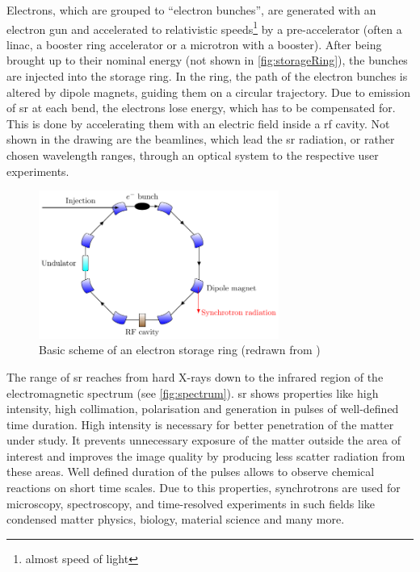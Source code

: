 Electrons, which are grouped to ``electron bunches'', are generated with an electron gun and accelerated to relativistic speeds\footnote{almost speed of light} by a pre-accelerator (often a \gls{linac}, a booster ring accelerator or a microtron with a booster). 
After being brought up to their nominal energy (not shown in \autoref{fig:storageRing}), the bunches are injected into the storage ring.
In the ring, the path of the electron bunches is altered by dipole magnets, guiding them on a circular trajectory.
Due to emission of \gls{sr} at each bend, the electrons lose energy, which has to be compensated for.
This is done by accelerating them with an electric field inside a \gls{rf} cavity.
Not shown in the drawing are the beamlines, which lead the \gls{sr} radiation, or rather chosen wavelength ranges, through an optical system to the respective user experiments. \cite{roussel2014,rota2018}

\begin{figure}[tb]
	\centering
	\includegraphics[width=0.7\textwidth]{chap/02-theory/img/bd/synchrotron.pdf}
	\caption{Basic scheme of an electron storage ring (redrawn from \cite{roussel2014})}
	\label{fig:storageRing}
\end{figure}

The range of \gls{sr} reaches from hard X-rays down to the infrared region of the electromagnetic spectrum (see \autoref{fig:spectrum}). \Gls{sr} shows properties like high intensity, high collimation, polarisation and generation in pulses of well-defined time duration.
High intensity is necessary for better penetration of the matter under study.
It prevents unnecessary exposure of the matter outside the area of interest and improves the image quality by producing less scatter radiation from these areas.
Well defined duration of the pulses allows to observe chemical reactions on short time scales.
Due to this properties, synchrotrons are used for microscopy, spectroscopy, and time-resolved experiments in such fields like condensed matter physics, biology, material science and many more.

